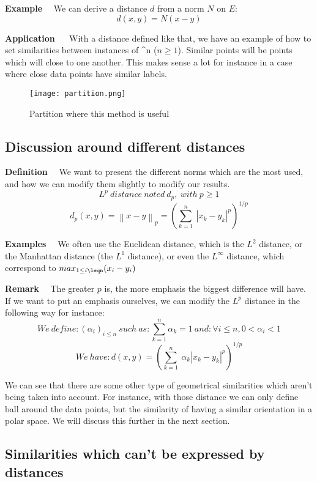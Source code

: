 \documentclass[a4paper,12pt]{article}
\begin{document}
\textbf{Example}$\quad$ We can derive a distance $d$ from a norm $N$ on $E$: 
$$ d(x,y)= N(x-y) $$

\textbf{Application} $\quad$ With a distance defined like that, we have an example of how to set similarities between instances of ^n ($n \geq 1$). Similar points will be points which will close to one another. This makes sense a lot for instance in a case where close data points have similar labels.

\begin{figure}[h]
	\centering
		\texttt{[image: partition.png]}
	\caption{Partition where this method is useful}
\end{figure}


\subsection{Discussion around different distances}

\textbf{Definition}$\quad$ We want to present the different norms which are the most used, and how we can modify them slightly to modify our results. $$L^p\:distance\:noted\:d_{p},\:with\:p\geq 1 $$
$$ d_{p}(x,y) = \left\| x-y \right\|_{p} = (\sum^n_{k=1}\:|x_{k}-y_{k}|^p)^{1/p} $$

\textbf{Examples}$\quad$ We often use the Euclidean distance, which is the $L^2$ distance, or the Manhattan distance (the $L^1$ distance), or even the $L^\infty$ distance, which correspond to  $max_{1\leq i\leqn} (x_{i}-y_{i})$

\textbf{Remark}$\quad$ The greater $p$ is, the more emphasis the biggest difference will have. If we want to put an emphasis ourselves, we can modify the $L^p$ distance in the following way for instance:
$$ We\:define: (\alpha_{i})_{i\leq n} \:such\:as: \sum^n_{k=1} \alpha_{k} = 1 \:and: \forall i\leq n , 0 < \alpha_{i} < 1 $$
$$ We\:have: d(x,y)= (\sum^n_{k=1}\:\alpha_{k}|x_{k}-y_{k}|^p)^{1/p} $$

	We can see that there are some other type of geometrical similarities which aren't being taken into account. For instance, with those distance we can only define ball around the data points, but the similarity of having a similar orientation in a polar space. We will discuss this further in the next section.

\subsection{Similarities which can't be expressed by distances}
\end{document}
